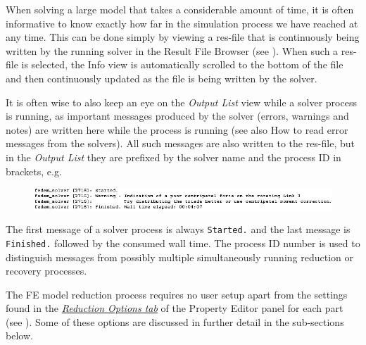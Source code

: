 {

When solving a large model that takes a considerable amount of time, it
is often informative to know exactly how far in the simulation process
we have reached at any time. This can be done simply by viewing a
res-file that is continuously being written by the running solver in the
Result File Browser (see ).
When such a res-file is selected,
the Info view is automatically scrolled to the bottom of the file
and then continuously updated as the file is being written by the solver.


\clearpage
It is often wise to also keep an eye on the {\sl Output List} view
while a solver process is running, as important messages produced by the
solver (errors, warnings and notes) are written here while the process
is running (see also
           {How to read error messages from the solvers}).
All such messages are also written to the res-file, but in the {\sl Output List}
they are prefixed by the solver name and the process ID in brackets, e.g.

\begin{figure}[!h]
  \textwidth
  \includegraphics[width=1.27\textwidth]{Figures/6-SolverMessages}
\end{figure}

The first message of a solver process is always {\tt Started.}
and the last message is {\tt Finished.} followed by the consumed wall time.
The process ID number is used to distinguish messages from possibly multiple
simultaneously running reduction or recovery processes.



The FE model reduction process requires no user setup apart from the settings
found in the \protect\hyperlink{reduction-options-tab}
{\sl Reduction Options tab} of the Property Editor panel for each part
(see ).
Some of these options are discussed in further detail in the sub-sections below.


}
